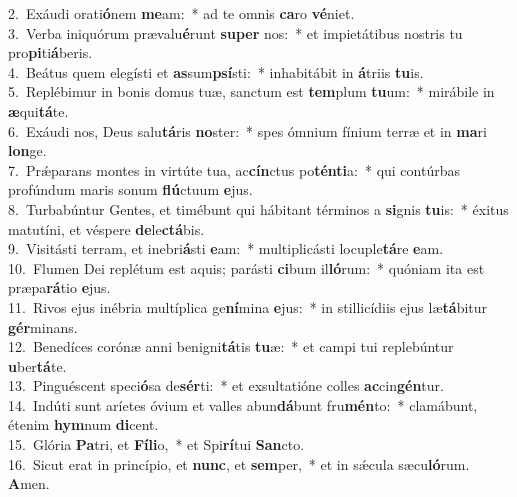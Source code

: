 {2.~}Exáudi orati\textbf{ó}nem \textbf{me}am:~* ad te omnis \textbf{ca}ro \textbf{vé}niet.\\
{3.~}Verba iniquórum prævalu\textbf{é}runt \textbf{su}\textbf{per} nos:~* et impietátibus nostris tu pro\textbf{pi}ti\textbf{á}beris.\\
{4.~}Beátus quem elegísti et \textbf{as}sum\textbf{psí}sti:~* inhabitábit in \textbf{á}triis \textbf{tu}is.\\
{5.~}Replébimur in bonis domus tuæ, sanctum est \textbf{tem}plum \textbf{tu}um:~* mirábile in \textbf{æ}qui\textbf{tá}te.\\
{6.~}Exáudi nos, Deus salu\textbf{tá}ris \textbf{no}ster:~* spes ómnium fínium terræ et in \textbf{ma}ri \textbf{lon}ge.\\
{7.~}Prǽparans montes in virtúte tua, ac\textbf{cín}ctus po\textbf{tén}\textbf{ti}a:~* qui contúrbas profúndum maris sonum \textbf{flú}ctuum \textbf{e}jus.\\
{8.~}Turbabúntur Gentes, et timébunt qui hábitant términos a \textbf{si}gnis \textbf{tu}is:~* éxitus matutíni, et véspere \textbf{de}le\textbf{ctá}bis.\\
{9.~}Visitásti terram, et inebri\textbf{á}sti \textbf{e}am:~* multiplicásti locuple\textbf{tá}re \textbf{e}am.\\
{10.~}Flumen Dei replétum est aquis; parásti \textbf{ci}bum il\textbf{ló}rum:~* quóniam ita est præpa\textbf{rá}tio \textbf{e}jus.\\
{11.~}Rivos ejus inébria multíplica ge\textbf{ní}mina \textbf{e}jus:~* in stillicídiis ejus læ\textbf{tá}bitur \textbf{gér}minans.\\
{12.~}Benedíces corónæ anni benigni\textbf{tá}tis \textbf{tu}æ:~* et campi tui replebúntur \textbf{u}ber\textbf{tá}te.\\
{13.~}Pinguéscent speci\textbf{ó}sa de\textbf{sér}ti:~* et exsultatióne colles \textbf{ac}cin\textbf{gén}tur.\\
{14.~}Indúti sunt aríetes óvium et valles abun\textbf{dá}bunt fru\textbf{mén}to:~* clamábunt, étenim \textbf{hym}num \textbf{di}cent.\\
{15.~}Glória \textbf{Pa}tri, et \textbf{Fí}\textbf{li}o,~* et Spi\textbf{rí}tui \textbf{San}cto.\\
{16.~}Sicut erat in princípio, et \textbf{nunc}, et \textbf{sem}per,~* et in sǽcula sæcu\textbf{ló}rum. \textbf{A}men.\\
